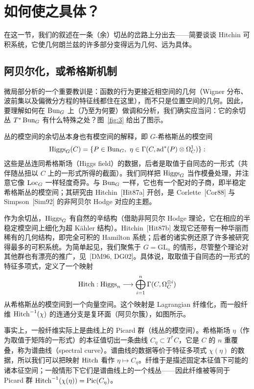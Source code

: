 \section{如何使之具体？}\label{sec:4}

在这一节，我们的叙述在一条（余）切丛的岔路上分出去——简要谈谈 Hitchin 可积系统，它使几何朗兰兹的许多部分变得远为几何、远为具体。

\subsection{阿贝尔化，或希格斯机制}\label{sec:4.1}

微局部分析的一个重要教训是：函数的行为更接近相空间的几何（Wigner 分布、波前集以及偏微分方程的特征线都住在这里），而不只是位置空间的几何。因此，要理解如何在 $\operatorname{Bun}_{G}$ 上（乃至为何要）做调和分析，我们确实应当问：它的余切丛 $T^{*}\operatorname{Bun}_{G}$ 有什么特殊之处？图~\ref{fig:3} 给出了图示。

丛的模空间的余切丛本身也有模空间的解释，即 $G$-希格斯丛的模空间
\[
\Higgs_{G}(C)=\{P\in\Bun_{G},\ \eta\in\Gamma(C,\mathrm{ad}^{*}(P)\otimes\Omega^{1}_{C})\}:
\]
这些是丛连同希格斯场（Higgs field）的数据，后者是取值于自同态的一形式（共伴随丛扭以 $C$ 上的一形式所得的截面）。我们同样把 $\operatorname{Higgs}_{G}$ 当作模叠处理，并注意它像 $\operatorname{Loc}_{G}$ 一样轻度奇异。与 $\operatorname{Bun}_{G}$ 一样，它也有一个配对的子商，即半稳定希格斯丛的模空间；其研究由 Hitchin~[Hit87a] 开创，是 Corlette~[Cor88] 与 Simpson~[Sim92] 的非阿贝尔 Hodge 对应的主题。

作为余切丛，$\operatorname{Higgs}_{G}$ 有自然的辛结构（借助非阿贝尔 Hodge 理论，它在相应的半稳定模空间上细化为超 Kähler 结构）。Hitchin~[Hit87b] 发现它还带有一种华丽而稀有的几何结构，即完全可积的 Hamilton 系统；后者的诸实例还原了许多被研究得最多的可积系统。为简单起见，我们聚焦于 $G=\mathrm{GL}_{n}$ 的情形，尽管整个理论对其他群也有漂亮的推广，见~[DM96, DG02]。具体说，取取值于自同态的一形式的特征多项式，定义了一个映射
\begin{equation}\label{eq:hitchin}
\operatorname{Hitch}:\operatorname{Higgs}_{n}\longrightarrow\bigoplus_{i=1}^{n}\Gamma(C,\Omega^{\otimes i}_{C})
\end{equation}
从希格斯丛的模空间到一个向量空间。这个映射是 Lagrangian 纤维化，而一般纤维 $\operatorname{Hitch}^{-1}(\chi)$ 的连通分支是复环面（阿贝尔簇），如图所示。

事实上，一般纤维实际上是曲线上的 Picard 群（线丛的模空间）。希格斯场 $\eta$（作为取值于矩阵的一形式）的本征值切出一条曲线 $C_{\eta}\subset T^{*}C$，它是 $C$ 的 $n$ 重覆叠，称为谱曲线（spectral curve）。谱曲线的数据等价于特征多项式 $\chi(\eta)$ 的数据，所以我们可以把映射 $\operatorname{Hitch}$ 看作 $\eta\mapsto C_{\eta}$。纤维于是描述固定本征值下可能的诸本征空间；一般情形下它们是谱曲线上的一个线丛——因此纤维被等同于 Picard 群 $\operatorname{Hitch}^{-1}(\chi(\eta))=\mathrm{Pic}(C_{\eta})$。

